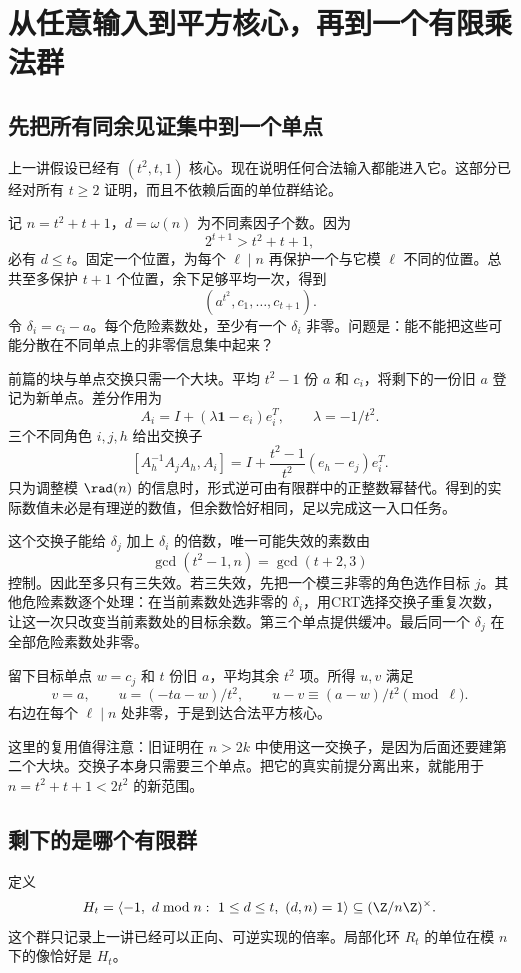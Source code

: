 \chapter{从任意输入到平方核心，再到一个有限乘法群}\label{ch:entry}
\section{先把所有同余见证集中到一个单点}
上一讲假设已经有 $(t^2,t,1)$ 核心。现在说明任何合法输入都能进入它。这部分已经对所有 $t\ge2$ 证明，而且不依赖后面的单位群结论。

记 $n=t^2+t+1$，$d=\omega(n)$ 为不同素因子个数。因为
\[2^{t+1}>t^2+t+1,
\]
必有 $d\le t$。固定一个位置，为每个 $\ell\mid n$ 再保护一个与它模 $\ell$ 不同的位置。总共至多保护 $t+1$ 个位置，余下足够平均一次，得到
\[(a^{t^2},c_1,\ldots,c_{t+1}).
\]
令 $\delta_i=c_i-a$。每个危险素数处，至少有一个 $\delta_i$ 非零。问题是：能不能把这些可能分散在不同单点上的非零信息集中起来？

前篇的块与单点交换只需一个大块。平均 $t^2-1$ 份 $a$ 和 $c_i$，将剩下的一份旧 $a$ 登记为新单点。差分作用为
\[A_i=I+(\lambda\mathbf1-e_i)e_i^T,\qquad\lambda=-1/t^2.
\]
三个不同角色 $i,j,h$ 给出交换子
\[[A_h^{-1}A_jA_h,A_i]
=I+\frac{t^2-1}{t^2}(e_h-e_j)e_i^T.
\]
只为调整模 $\rad(n)$ 的信息时，形式逆可由有限群中的正整数幂替代。得到的实际数值未必是有理逆的数值，但余数恰好相同，足以完成这一入口任务。

这个交换子能给 $\delta_j$ 加上 $\delta_i$ 的倍数，唯一可能失效的素数由
\[\gcd(t^2-1,n)=\gcd(t+2,3)
\]
控制。因此至多只有三失效。若三失效，先把一个模三非零的角色选作目标 $j$。其他危险素数逐个处理：在当前素数处选非零的 $\delta_i$，用CRT选择交换子重复次数，让这一次只改变当前素数处的目标余数。第三个单点提供缓冲。最后同一个 $\delta_j$ 在全部危险素数处非零。

留下目标单点 $w=c_j$ 和 $t$ 份旧 $a$，平均其余 $t^2$ 项。所得 $u,v$ 满足
\[v=a,\qquad u=(-ta-w)/t^2,\qquad
u-v\equiv(a-w)/t^2\pmod\ell.
\]
右边在每个 $\ell\mid n$ 处非零，于是到达合法平方核心。

这里的复用值得注意：旧证明在 $n>2k$ 中使用这一交换子，是因为后面还要建第二个大块。交换子本身只需要三个单点。把它的真实前提分离出来，就能用于 $n=t^2+t+1<2t^2$ 的新范围。

\section{剩下的是哪个有限群}
定义
\begin{equation}\label{eq:Ht}
H_t=\langle-1,\ d\bmod n:\ 1\le d\le t,\ (d,n)=1\rangle
\subseteq(\Z/n\Z)^\times.
\end{equation}
这个群只记录上一讲已经可以正向、可逆实现的倍率。局部化环 $R_t$ 的单位在模 $n$ 下的像恰好是 $H_t$。

